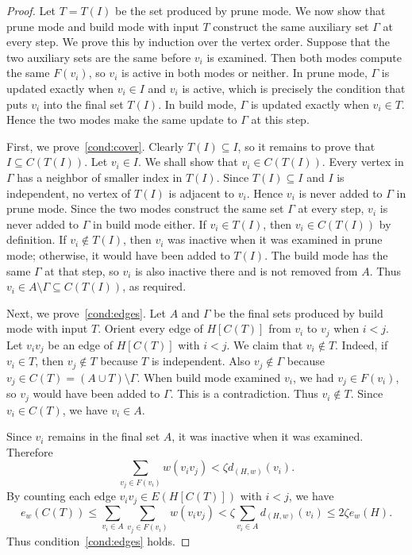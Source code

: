 \documentclass[12pt]{article}
\numberwithin{equation}{section}
\theoremstyle{definition}
\begin{document}
\begin{proof}
Let $T=T(I)$ be the set produced by prune mode. We now show that prune mode
and build mode with input $T$ construct the same auxiliary set $\Gamma$ at
every step. We prove this by induction over the vertex order. Suppose that
the two auxiliary sets are the same before $v_i$ is examined. Then both modes
compute the same $F(v_i)$, so $v_i$ is active in both modes or neither. In
prune mode, $\Gamma$ is updated exactly when $v_i\in I$ and $v_i$ is active,
which is precisely the condition that puts $v_i$ into the final set $T(I)$.
In build mode, $\Gamma$ is updated exactly when $v_i\in T$. Hence the two
modes make the same update to $\Gamma$ at this step.

First, we prove~\ref{cond:cover}. Clearly $T(I)\subseteq I$, so it remains to
prove that $I\subseteq C(T(I))$. Let $v_i\in I$. We shall show that
$v_i\in C(T(I))$. Every vertex in $\Gamma$ has a neighbor of smaller index in
$T(I)$. Since $T(I)\subseteq I$ and $I$ is independent, no vertex of $T(I)$ is
adjacent to $v_i$. Hence $v_i$ is never added to $\Gamma$ in prune mode.
Since the two modes construct the same set $\Gamma$ at every step, $v_i$ is
never added to $\Gamma$ in build mode either. If $v_i\in T(I)$, then $v_i\in C(T(I))$ by definition. If
$v_i\notin T(I)$, then $v_i$ was inactive when it was examined in prune mode;
otherwise, it would have been added to $T(I)$. The build mode has the same
$\Gamma$ at that step, so $v_i$ is also inactive there and is not removed
from $A$. Thus $v_i\in A\setminus\Gamma\subseteq C(T(I))$, as required.
 
Next, we prove~\ref{cond:edges}. Let $A$ and $\Gamma$ be the final sets
produced by build mode with input $T$. Orient every edge of $H[C(T)]$ from $v_i$ to $v_j$
when $i < j$. Let $v_iv_j$ be an edge of $H[C(T)]$ with $i < j$. We claim that
$v_i \notin T$. Indeed, if $v_i \in T$, then $v_j \notin T$ because $T$ is
independent. Also $v_j \notin \Gamma$ because
$v_j \in C(T) = (A \cup T) \setminus \Gamma$. When build mode examined
$v_i$, we had
$v_j \in F(v_i)$, so $v_j$ would have been added to $\Gamma$. This is a
contradiction. Thus $v_i \notin T$. Since $v_i \in C(T)$, we have $v_i \in A$.

Since $v_i$ remains in the final set $A$, it was inactive when it was examined.
Therefore
\[
 \sum_{v_j \in F(v_i)} w(v_iv_j) < \zeta d_{(H,w)}(v_i).
\]
By counting each edge $v_iv_j\in E(H[C(T)])$ with $i<j$, we have
\[
 e_w(C(T))
 \leq \sum_{v_i \in A} \sum_{v_j \in F(v_i)} w(v_iv_j)
 < \zeta\sum_{v_i \in A} d_{(H,w)}(v_i)
 \leq 2\zeta e_w(H).
\]
Thus condition~\ref{cond:edges} holds.


\end{proof}
\end{document}
